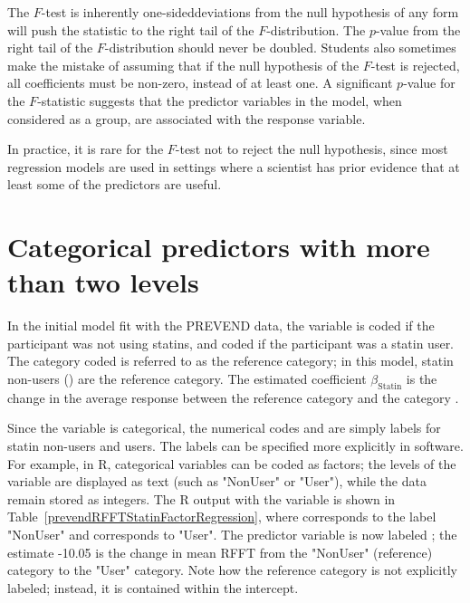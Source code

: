 The $F$-test is inherently one-sided\textemdash deviations from the null hypothesis of any form will push the statistic to the right tail of the $F$-distribution.  The $p$-value from the right tail of the $F$-distribution should never be doubled.  Students also sometimes make the mistake of assuming that if the null hypothesis of the $F$-test is rejected, all coefficients must be non-zero, instead of at least one. A significant $p$-value for the $F$-statistic suggests that the predictor variables in the model, when considered as a group, are associated with the response variable.

In practice, it is rare for the $F$-test not to reject the null hypothesis, since most regression models are used in settings where a scientist has prior evidence that at least some of the predictors are useful.

\newpage

\section{Categorical predictors with more than two levels}
\label{categoricalMoreThanTwoLevels}

In the initial model fit with the PREVEND data, the variable  is coded  if the participant was not using statins, and coded  if the participant was a statin user. The category coded  is referred to as the reference category; in this model, statin non-users () are the reference category. The estimated coefficient $\beta_{\text{Statin}}$ is the change in the average response between the reference category and the category .

Since the variable  is categorical, the numerical codes  and  are simply labels for statin non-users and users. The labels can be specified more explicitly in software. For example, in \textsf{R}, categorical variables can be coded as factors; the levels of the variable are displayed as text (such as "NonUser" or "User"), while the data remain stored as integers. The \textsf{R} output with the variable  is shown in Table~\ref{prevendRFFTStatinFactorRegression}, where  corresponds to the label "NonUser" and  corresponds to "User". The predictor variable is now labeled ; the estimate -10.05 is the change in mean RFFT from the "NonUser" (reference) category to the "User" category. Note how the reference category is not explicitly labeled; instead, it is contained within the intercept. 

